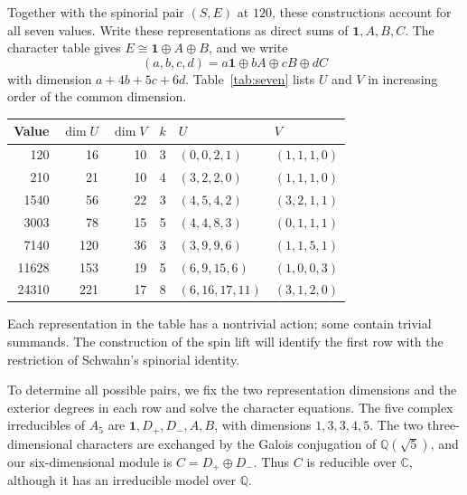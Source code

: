 \documentclass[11pt,a4paper]{article}
\begin{document}
Together with the spinorial pair \((S,E)\) at \(120\), these constructions account for all seven values. Write these representations as direct sums of $\mathbf1,A,B,C$. The character table gives \(E\cong\mathbf1\oplus A\oplus B\), and we write
\[
(a,b,c,d)=a\mathbf1\oplus bA\oplus cB\oplus dC
\]
with dimension \(a+4b+5c+6d\). Table~\ref{tab:seven} lists $U$ and $V$ in increasing order of the common dimension.

\begin{center}
\begin{minipage}{\linewidth}
\label{tab:seven}
\centering
\small
\renewcommand{\arraystretch}{1.16}
\setlength{\tabcolsep}{8pt}
\begin{tabular}{rrrrll}
\toprule
Value & \(\dim U\) & \(\dim V\) & \(k\) & \(U\) & \(V\)\\
\midrule
120 & 16 & 10 & 3 & \((0,0,2,1)\) & \((1,1,1,0)\)\\
210 & 21 & 10 & 4 & \((3,2,2,0)\) & \((1,1,1,0)\)\\
1540 & 56 & 22 & 3 & \((4,5,4,2)\) & \((3,2,1,1)\)\\
3003 & 78 & 15 & 5 & \((4,4,8,3)\) & \((0,1,1,1)\)\\
7140 & 120 & 36 & 3 & \((3,9,9,6)\) & \((1,1,5,1)\)\\
11628 & 153 & 19 & 5 & \((6,9,15,6)\) & \((1,0,0,3)\)\\
24310 & 221 & 17 & 8 & \((6,16,17,11)\) & \((3,1,2,0)\)\\
\bottomrule
\end{tabular}
\end{minipage}
\end{center}

Each representation in the table has a nontrivial action; some contain trivial summands. The construction of the spin lift will identify the first row with the restriction of Schwahn's spinorial identity.

To determine all possible pairs, we fix the two representation dimensions and the exterior degrees in each row and solve the character equations. The five complex irreducibles of $A_5$ are $\mathbf1,D_+,D_-,A,B$, with dimensions $1,3,3,4,5$. The two three-dimensional characters are exchanged by the Galois conjugation of $\mathbb Q(\sqrt5)$, and our six-dimensional module is $C=D_+\oplus D_-$. Thus $C$ is reducible over $\mathbb C$, although it has an irreducible model over $\mathbb Q$.
\end{document}
